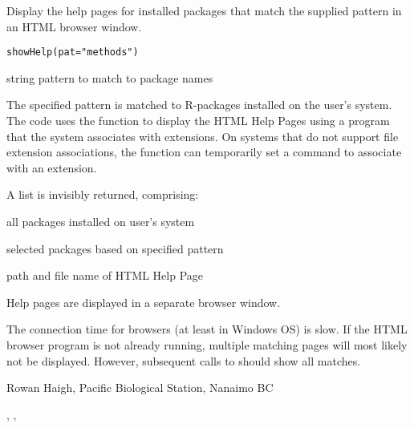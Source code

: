 \documentclass[letterpaper]{book}
\begin{document}
\begin{Description}\relax
Display the help pages for installed packages that match the 
supplied pattern in an HTML browser window.
\end{Description}
\begin{Usage}
\begin{verbatim}
showHelp(pat="methods")
\end{verbatim}
\end{Usage}
\begin{Arguments}
\begin{ldescription}
\item[\code{pat}] string pattern to match to package names
\end{ldescription}
\end{Arguments}
\begin{Details}\relax
The specified pattern is matched to R-packages installed on 
the user's system. The code uses the  
function  to display the HTML Help Pages using 
a program that the system associates with  
extensions. On systems that do not support file extension 
associations, the function  can temporarily 
set a command to associate with an extension.
\end{Details}
\begin{Value}
A list is invisibly returned, comprising:
\begin{ldescription}
\item[\code{Apacks}] all packages installed on user's system
\item[\code{Spacks}] selected packages based on specified pattern
\item[\code{URLs}] path and file name of HTML Help Page
\end{ldescription}

Help pages are displayed in a separate browser window.
\end{Value}
\begin{Note}\relax
The connection time for browsers (at least in Windows OS)
is slow. If the HTML browser program is not already running,
multiple matching pages will most likely not be displayed. However, 
subsequent calls to  should show all matches.
\end{Note}
\begin{Author}\relax
Rowan Haigh, Pacific Biological Station, Nanaimo BC
\end{Author}
\begin{SeeAlso}\relax
{}, , 
\end{SeeAlso}
\end{document}
